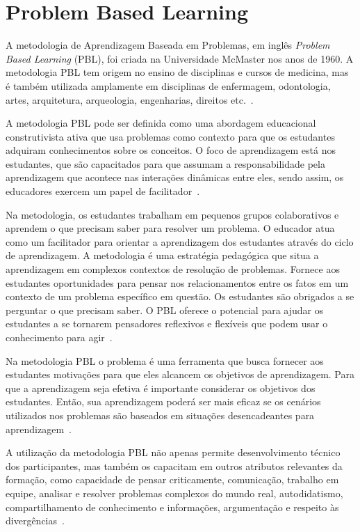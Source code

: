 \section{Problem Based Learning}
\label{sec-revisao-pbl}
A metodologia de Aprendizagem Baseada em Problemas, em
inglês \textit{Problem Based Learning} (PBL),
foi criada na Universidade McMaster nos anos de 1960.
A metodologia \ac{PBL} tem origem no ensino de disciplinas e cursos de medicina,
mas é também utilizada amplamente em disciplinas de enfermagem,
odontologia, artes, arquitetura, arqueologia, engenharias, direitos
etc.~\cite{albanese2010problem, amos1998problem}.

A metodologia \ac{PBL} pode ser definida como uma abordagem educacional
construtivista ativa que usa problemas como contexto para que os estudantes
adquiram conhecimentos sobre os conceitos. O foco de aprendizagem está
nos estudantes, que são capacitados para que assumam a responsabilidade pela
aprendizagem que acontece nas interações dinâmicas
entre eles, sendo assim, os educadores exercem um papel
de facilitador~\cite{dolmans2005problem, albanese2010problem,
amos1998problem, forsythe2002problem}.

Na metodologia, os estudantes trabalham em pequenos grupos colaborativos
e aprendem o que precisam saber para resolver um problema.
O educador atua como um facilitador para orientar a aprendizagem
dos estudantes através do ciclo
de aprendizagem.
A metodologia é uma estratégia pedagógica que situa a aprendizagem em
complexos contextos de resolução de problemas.
Fornece aos estudantes oportunidades para pensar nos relacionamentos
entre os fatos em um contexto de um problema específico em questão.
Os estudantes são obrigados a se perguntar o que precisam saber.
O \ac{PBL} oferece o potencial para ajudar os estudantes a se tornarem
pensadores reflexivos e flexíveis que podem usar o conhecimento
para agir~\cite{hmelo2004problem}.

Na metodologia \ac{PBL} o problema é uma ferramenta que busca fornecer
aos estudantes motivações para que eles alcancem os
objetivos de aprendizagem.
Para que a aprendizagem seja efetiva é importante considerar os objetivos
dos estudantes.
Então, sua aprendizagem poderá ser mais eficaz se os cenários utilizados
nos problemas são baseados em situações desencadeantes para
aprendizagem~\cite{wood2003problem, o2012practical, amos1998problem}.

A utilização da metodologia \ac{PBL} não apenas permite desenvolvimento
técnico dos participantes, mas também os capacitam em outros
atributos relevantes da formação, como capacidade de pensar
criticamente, comunicação, trabalho em equipe,
analisar e resolver problemas complexos do mundo real,
autodidatismo, compartilhamento de conhecimento e informações,
argumentação e respeito às
divergências~\cite{wood2003problem, savery2015overview}.


